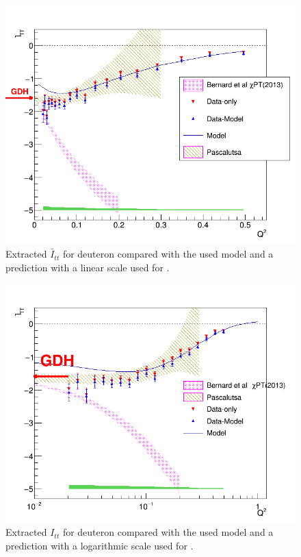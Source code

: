\begin{figure}[H] %
  \centering
  \leavevmode \includegraphics[width=1.0\textwidth]{figuresEG4/FigResults/integralsFromCombinedG1nA1F1_Wbins70IttLowQ2.png} 
  \caption[$\bar{I}_{tt}$ (linear scale)]{Extracted $\bar{I}_{tt}$ for deuteron compared with the used model and a \chipts prediction  with a linear scale used for \qsq.}
  \label{GDHLow}  
\end{figure}

\begin{figure}[H] %
  \centering
  \leavevmode \includegraphics[width=1.0\textwidth]{figuresEG4/FigResults/integralsFromCombinedG1nA1F1_Wbins70IttLogN.png} 
  \caption[$I^d_{tt}$ (log scale)]{Extracted $I_{tt}$ for deuteron compared with the used model and a \chipts prediction  with a logarithmic scale used for \qsq.}
  \label{GDHLog}  
\end{figure}




